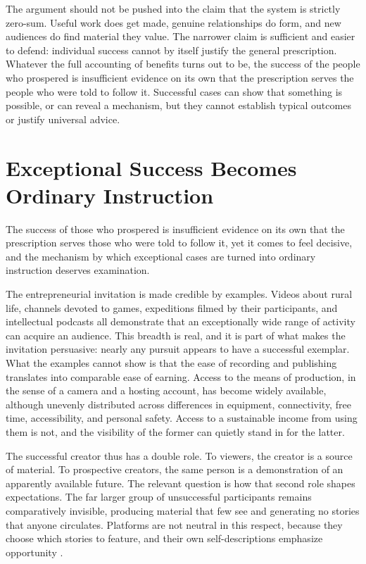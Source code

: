 \documentclass[12pt]{article}
\theoremstyle{plain}
\theoremstyle{definition}
\begin{document}
The argument should not be pushed into the claim that the system is strictly zero-sum. Useful work does get made, genuine relationships do form, and new audiences do find material they value. The narrower claim is sufficient and easier to defend: individual success cannot by itself justify the general prescription. Whatever the full accounting of benefits turns out to be, the success of the people who prospered is insufficient evidence on its own that the prescription serves the people who were told to follow it. Successful cases can show that something is possible, or can reveal a mechanism, but they cannot establish typical outcomes or justify universal advice.

\section{Exceptional Success Becomes Ordinary Instruction}

The success of those who prospered is insufficient evidence on its own that the prescription serves those who were told to follow it, yet it comes to feel decisive, and the mechanism by which exceptional cases are turned into ordinary instruction deserves examination.

The entrepreneurial invitation is made credible by examples. Videos about rural life, channels devoted to games, expeditions filmed by their participants, and intellectual podcasts all demonstrate that an exceptionally wide range of activity can acquire an audience. This breadth is real, and it is part of what makes the invitation persuasive: nearly any pursuit appears to have a successful exemplar. What the examples cannot show is that the ease of recording and publishing translates into comparable ease of earning. Access to the means of production, in the sense of a camera and a hosting account, has become widely available, although unevenly distributed across differences in equipment, connectivity, free time, accessibility, and personal safety. Access to a sustainable income from using them is not, and the visibility of the former can quietly stand in for the latter.

The successful creator thus has a double role. To viewers, the creator is a source of material. To prospective creators, the same person is a demonstration of an apparently available future. The relevant question is how that second role shapes expectations. The far larger group of unsuccessful participants remains comparatively invisible, producing material that few see and generating no stories that anyone circulates. Platforms are not neutral in this respect, because they choose which stories to feature, and their own self-descriptions emphasize opportunity \cite{gillespie2010,abidin2018}.
\end{document}
